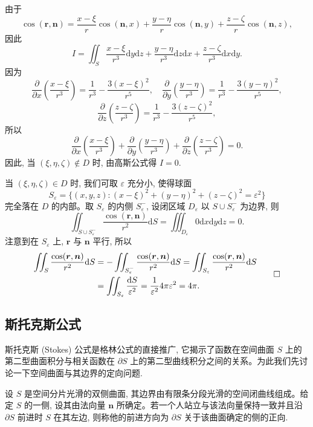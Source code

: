 \begin{solve}
由于
\[
  \cos(\boldsymbol r,\boldsymbol n)
  =\frac{x-\xi}{r}\cos(\boldsymbol n,x)
   +\frac{y-\eta}{r}\cos(\boldsymbol n,y)
   +\frac{z-\zeta}{r}\cos(\boldsymbol n,z),
\]
因此
\[
  I=\iint_S\frac{x-\xi}{r^3}\mathrm dy\mathrm dz
    +\frac{y-\eta}{r^3}\mathrm dz\mathrm dx
    +\frac{z-\zeta}{r^3}\mathrm dx\mathrm dy.
\]
因为
\[
  \frac{\partial}{\partial x}\left(\frac{x-\xi}{r^3}\right)=\frac1{r^3}-\frac{3(x-\xi)^2}{r^5},\quad
  \frac{\partial}{\partial y}\left(\frac{y-\eta}{r^3}\right)=\frac1{r^3}-\frac{3(y-\eta)^2}{r^5},
\]
\[
  \frac{\partial}{\partial z}\left(\frac{z-\zeta}{r^3}\right)=\frac1{r^3}-\frac{3(z-\zeta)^2}{r^5},
\]
所以
\[
  \frac{\partial}{\partial x}\left(\frac{x-\xi}{r^3}\right)
  +\frac{\partial}{\partial y}\left(\frac{y-\eta}{r^3}\right)
  +\frac{\partial}{\partial z}\left(\frac{z-\zeta}{r^3}\right)=0.
\]
因此, 当 $(\xi,\eta,\zeta)\notin D$ 时, 由高斯公式得 $I=0$.

当 $(\xi,\eta,\zeta)\in D$ 时, 我们可取 $\varepsilon$ 充分小, 使得球面
\[
  S_\varepsilon=\{(x,y,z):(x-\xi)^2+(y-\eta)^2+(z-\zeta)^2=\varepsilon^2\}
\]
完全落在 $D$ 的内部。取 $S_\varepsilon$ 的内侧 $S_\varepsilon^-$, 设闭区域 $D_\varepsilon$ 以 $S\cup S_\varepsilon^-$ 为边界, 则
\[
  \iint_{S\cup S_\varepsilon^-}\frac{\cos(\boldsymbol r,\boldsymbol n)}{r^2}\mathrm dS
  =\iiint_{D_\varepsilon}0\mathrm dx\mathrm dy\mathrm dz=0.
\]
注意到在 $S_\varepsilon$ 上, $\boldsymbol r$ 与 $\boldsymbol n$ 平行, 所以
\[
\begin{aligned}
  \iint_S\frac{\cos(\boldsymbol r,\boldsymbol n)}{r^2}\mathrm dS
  &=-\iint_{S_\varepsilon^-}\frac{\cos(\boldsymbol r,\boldsymbol n)}{r^2}\mathrm dS
    =\iint_{S_\varepsilon}\frac{\cos(\boldsymbol r,\boldsymbol n)}{r^2}\mathrm dS\\
  &=\iint_{S_\varepsilon}\frac{\mathrm dS}{\varepsilon^2}
    =\frac1{\varepsilon^2}4\pi\varepsilon^2=4\pi.
\end{aligned}
\qedhere
\]
\end{solve}


\subsection{斯托克斯公式}
\label{subsec:ma-16-5-3}

斯托克斯 (Stokes) 公式是格林公式的直接推广, 它揭示了函数在空间曲面 $S$ 上的第二型曲面积分与相关函数在 $\partial S$ 上的第二型曲线积分之间的关系。为此我们先讨论一下空间曲面与其边界的定向问题.

设 $S$ 是空间分片光滑的双侧曲面, 其边界由有限条分段光滑的空间闭曲线组成。给定 $S$ 的一侧, 设其由法向量 $\boldsymbol n$ 所确定。若一个人站立与该法向量保持一致并且沿 $\partial S$ 前进时 $S$ 在其左边, 则称他的前进方向为 $\partial S$ 关于该曲面确定的侧的正向.

